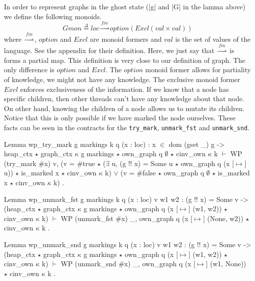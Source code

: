 \documentclass[nocopyrightspace]{sigplanconf}
\def\MyMLe{\lstinline[language=MyML, basicstyle=\small\ttfamily]}
\newcommand{\defeq}{\overset{\Delta}{=}}
\newcommand{\val}{\mathit{val}}
\newcommand{\loc}{\mathit{loc}}
\newcommand{\option}{\mathit{option}}
\newcommand{\Excl}{\mathit{Excl}}
\newcommand{\finmap}{\overset{\mathit{fin}}{\rightharpoonup}}
\begin{document}
In order to represent graphs in the ghost state (\Coqe|g| and \Coqe|G| in the lamma above) we define the following monoids.
\[
\mathit{Gmon} \defeq \loc \finmap \option(\Excl(\val \times \val))
\]
where $\finmap$, $\option$ and $\Excl$ are monoid formers and $\val$ is the set of values of the language.
See the appendix for their definition.
Here, we just say that $\finmap$ is forms a partial map.
This definition is very close to our definition of graph.
The only difference is $\option$ and $\Excl$.
The $\option$ monoid former allows for partiality of knowledge,
we might not have any knowledge.
The exclusive monoid former $\Excl$ enforces exclusiveness of the
information.
If we know that a node has specific children, then other threads
can't have any knowledge about that node.
On other hand, knowing the children of a node allows us to mutate its
children. Notice that this is only possible if we have marked the node
ourselves.
These facts can be seen in the contracts for the \MyMLe{try_mark},
\MyMLe{unmark_fst} and \MyMLe{unmark_snd}.
\begin{Coq}
Lemma wp_try_mark g markings k q (x : loc) : x $\in$ dom (gset _) g ->
    heap_ctx $\star$ graph_ctx $\kappa$ g markings $\star$ own_graph q $\emptyset$
     $\star$ cinv_own $\kappa$ k
    $\vdash$ WP (try_mark $\#$x) {{ v,
         (v = $\#$true $\star$ ($\exists$ u, (g !! x) = Some u $\star$ own_graph q (x [$\mapsto$] u))
          $\star$ is_marked x $\star$ cinv_own $\kappa$ k)
           $\lor$ (v = $\#$false $\star$ own_graph q $\emptyset$ $\star$ is_marked x
              $\star$ cinv_own $\kappa$ k) }}.
\end{Coq}

\begin{Coq}
Lemma wp_unmark_fst g markings k q (x : loc) v w1 w2 :
    (g !! x) = Some v ->
    (heap_ctx $\star$ graph_ctx $\kappa$ g markings
     $\star$ own_graph q (x [$\mapsto$] (w1, w2)) $\star$ cinv_own $\kappa$ k) $\vdash$
      WP (unmark_fst $\#$x)
      {{ _, own_graph q (x [$\mapsto$] (None, w2)) $\star$ cinv_own $\kappa$ k }}.
\end{Coq}

\begin{Coq}
Lemma wp_unmark_snd g markings k q (x : loc) v w1 w2 :
    (g !! x) = Some v ->
    (heap_ctx $\star$ graph_ctx $\kappa$ g markings
    $\star$ own_graph q (x [$\mapsto$] (w1, w2)) $\star$ cinv_own $\kappa$ k) $\vdash$
      WP (unmark_snd $\#$x)
      {{ _, own_graph q (x [$\mapsto$] (w1, None)) $\star$ cinv_own $\kappa$ k }}.
\end{Coq}
\end{document}
